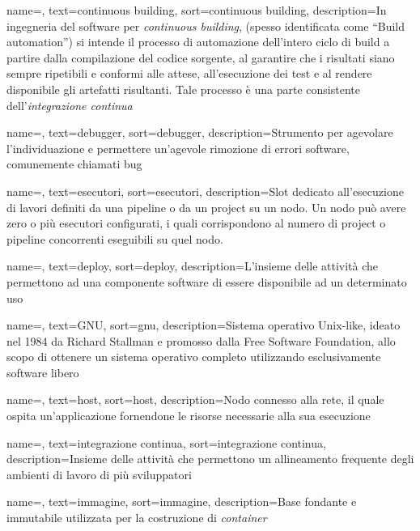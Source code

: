 {
    name=,
    text=continuous building,
    sort=continuous building,
    description={In ingegneria del software per \emph{continuous building}, (spesso identificata come ``Build automation'') si intende il processo di automazione dell'intero ciclo di build a partire dalla compilazione del codice sorgente, al garantire che i risultati siano sempre ripetibili e conformi alle attese, all'esecuzione dei test e al rendere disponibile gli artefatti risultanti. Tale processo è una parte consistente dell'\textit{integrazione continua}}
}

{
    name=,
    text=debugger,
    sort=debugger,
    description={Strumento per agevolare l'individuazione e permettere un'agevole rimozione di errori software, comunemente chiamati bug}
}

{
    name=,
    text=esecutori,
    sort=esecutori,
    description={Slot dedicato all'esecuzione di lavori definiti da una pipeline o da un project su un nodo. Un nodo può avere zero o più esecutori configurati, i quali corrispondono al numero di project o pipeline concorrenti eseguibili su quel nodo.}
}

{
    name=,
    text=deploy,
    sort=deploy,
    description={L'insieme delle attività che permettono ad una componente software di essere disponibile ad un determinato uso}
}

{
    name=,
    text=GNU,
    sort=gnu,
    description={Sistema operativo Unix-like, ideato nel 1984 da Richard Stallman e promosso dalla Free Software Foundation, allo scopo di ottenere un sistema operativo completo utilizzando esclusivamente software libero}
}

{
    name=,
    text=host,
    sort=host,
    description={Nodo connesso alla rete, il quale ospita un'applicazione fornendone le risorse necessarie alla sua esecuzione}
}

{
    name=,
    text=integrazione continua,
    sort=integrazione continua,
    description={Insieme delle attività che permettono un allineamento frequente degli ambienti di lavoro di più sviluppatori}
}

{
    name=,
    text=immagine,
    sort=immagine,
    description={Base fondante e immutabile utilizzata per la costruzione di \textit{container}}
}

